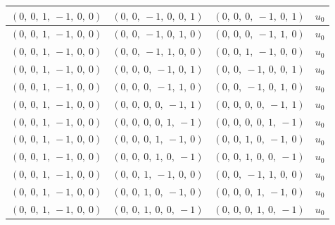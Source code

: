 \documentclass[11pt]{article}
\theoremstyle{definition}
\begin{document}
\begin{longtable}{|l|l|l|c|}
    \hline
    $\left( 0, \  0, \  1, \  -1, \  0, \  0\right)$ & $\left( 0, \  0, \  -1, \  0, \  0, \  1\right)$ & $\left( 0, \  0, \  0, \  -1, \  0, \  1\right)$ & $u_{0}$ \\
    \hline
    $\left( 0, \  0, \  1, \  -1, \  0, \  0\right)$ & $\left( 0, \  0, \  -1, \  0, \  1, \  0\right)$ & $\left( 0, \  0, \  0, \  -1, \  1, \  0\right)$ & $u_{0}$ \\
    \hline
    $\left( 0, \  0, \  1, \  -1, \  0, \  0\right)$ & $\left( 0, \  0, \  -1, \  1, \  0, \  0\right)$ & $\left( 0, \  0, \  1, \  -1, \  0, \  0\right)$ & $u_{0}$ \\
    \hline
    $\left( 0, \  0, \  1, \  -1, \  0, \  0\right)$ & $\left( 0, \  0, \  0, \  -1, \  0, \  1\right)$ & $\left( 0, \  0, \  -1, \  0, \  0, \  1\right)$ & $u_{0}$ \\
    \hline
    $\left( 0, \  0, \  1, \  -1, \  0, \  0\right)$ & $\left( 0, \  0, \  0, \  -1, \  1, \  0\right)$ & $\left( 0, \  0, \  -1, \  0, \  1, \  0\right)$ & $u_{0}$ \\
    \hline
    $\left( 0, \  0, \  1, \  -1, \  0, \  0\right)$ & $\left( 0, \  0, \  0, \  0, \  -1, \  1\right)$ & $\left( 0, \  0, \  0, \  0, \  -1, \  1\right)$ & $u_{0}$ \\
    \hline
    $\left( 0, \  0, \  1, \  -1, \  0, \  0\right)$ & $\left( 0, \  0, \  0, \  0, \  1, \  -1\right)$ & $\left( 0, \  0, \  0, \  0, \  1, \  -1\right)$ & $u_{0}$ \\
    \hline
    $\left( 0, \  0, \  1, \  -1, \  0, \  0\right)$ & $\left( 0, \  0, \  0, \  1, \  -1, \  0\right)$ & $\left( 0, \  0, \  1, \  0, \  -1, \  0\right)$ & $u_{0}$ \\
    \hline
    $\left( 0, \  0, \  1, \  -1, \  0, \  0\right)$ & $\left( 0, \  0, \  0, \  1, \  0, \  -1\right)$ & $\left( 0, \  0, \  1, \  0, \  0, \  -1\right)$ & $u_{0}$ \\
    \hline
    $\left( 0, \  0, \  1, \  -1, \  0, \  0\right)$ & $\left( 0, \  0, \  1, \  -1, \  0, \  0\right)$ & $\left( 0, \  0, \  -1, \  1, \  0, \  0\right)$ & $u_{0}$ \\
    \hline
    $\left( 0, \  0, \  1, \  -1, \  0, \  0\right)$ & $\left( 0, \  0, \  1, \  0, \  -1, \  0\right)$ & $\left( 0, \  0, \  0, \  1, \  -1, \  0\right)$ & $u_{0}$ \\
    \hline
    $\left( 0, \  0, \  1, \  -1, \  0, \  0\right)$ & $\left( 0, \  0, \  1, \  0, \  0, \  -1\right)$ & $\left( 0, \  0, \  0, \  1, \  0, \  -1\right)$ & $u_{0}$ \\

\end{longtable}
\end{document}
